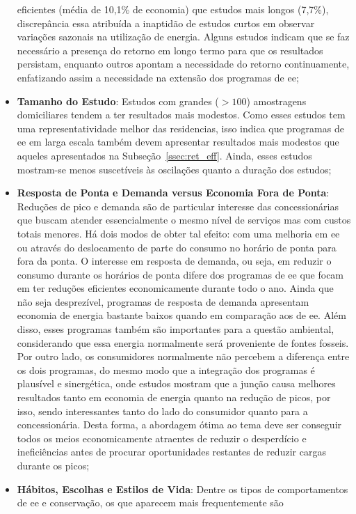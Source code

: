 \begin{itemize}
eficientes (média de 10,1\% de economia) que estudos mais longos (7,7\%),
discrepância essa atribuída a inaptidão de estudos curtos em observar variações
sazonais na utilização de energia. Alguns estudos indicam que se faz necessário 
a presença do retorno em longo termo para que os resultados persistam, 
enquanto outros apontam a necessidade do retorno continuamente, enfatizando
assim a necessidade na extensão dos programas de \gls{ee};
\item \textbf{Tamanho do Estudo}: Estudos com grandes ($> 100$) amostragens
domiciliares tendem a ter resultados mais modestos. Como esses estudos tem uma
representatividade melhor das residencias, isso indica que programas de
\gls{ee} em larga escala também devem apresentar resultados mais modestos que
aqueles apresentados na Subseção~\ref{ssec:ret_eff}.
Ainda, esses estudos mostram-se menos suscetíveis às oscilações 
quanto a duração dos estudos;
\item \textbf{Resposta de Ponta e Demanda versus Economia Fora de
Ponta}: Reduções de pico e demanda são de particular interesse das
concessionárias que buscam atender essencialmente o mesmo nível de
serviços mas com custos totais menores. Há dois modos de obter tal
efeito: com uma melhoria em \gls{ee} ou através do deslocamento de
parte do consumo no horário de ponta para fora da ponta. O interesse
em resposta de demanda, ou seja, em reduzir o consumo durante os
horários de ponta difere dos programas de \gls{ee} que focam em ter
reduções eficientes economicamente durante todo o ano. Ainda que não
seja desprezível, programas de resposta de demanda apresentam economia
de energia bastante baixos quando em comparação aos de \gls{ee}. Além
disso, esses programas também são importantes para a questão
ambiental, considerando que essa energia normalmente será proveniente
de fontes fosseis. Por outro lado, os consumidores normalmente não
percebem a diferença entre os dois programas, do mesmo modo que a
integração dos programas é plausível e sinergética, onde estudos
mostram que a junção causa melhores resultados tanto em economia de
energia quanto na redução de picos, por isso, sendo interessantes
tanto do lado do consumidor quanto para a concessionária. Desta forma,
a abordagem ótima ao tema deve ser conseguir todos os meios
economicamente atraentes de reduzir o desperdício e ineficiências
antes de procurar oportunidades restantes de reduzir cargas durante os
picos;
\item \textbf{Hábitos, Escolhas e Estilos de Vida}: Dentre os tipos de
comportamentos de \gls{ee} e conservação, os que aparecem mais frequentemente são 

\end{itemize}
